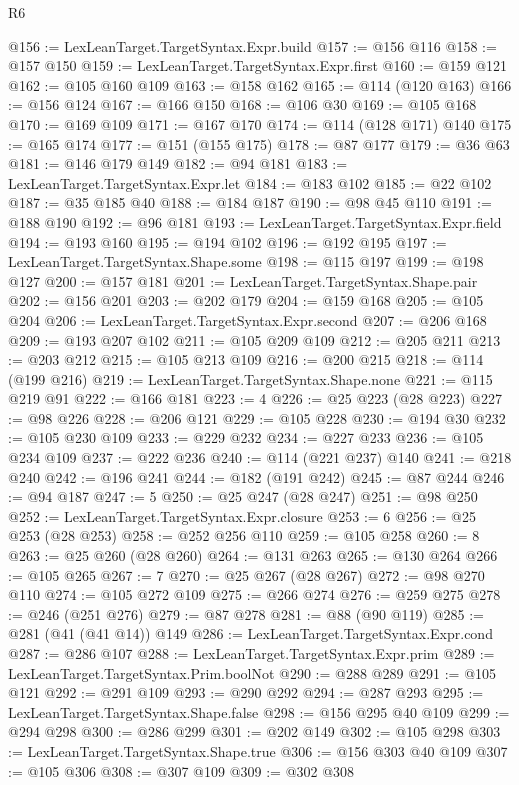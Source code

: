 \begin{lexlean}{R6}
\begin{coremodule}
{{{{{{{{{{{{{{{{{{{{{{{{{{{{{{{{{{{{{{{{{{{{{{{{{{{{{{{{{{{{{@156 := LexLeanTarget.TargetSyntax.Expr.build
@157 := @156 @116
@158 := @157 @150
@159 := LexLeanTarget.TargetSyntax.Expr.first
@160 := @159 @121
@162 := @105 @160 @109
@163 := @158 @162
@165 := @114 (@120 @163)
@166 := @156 @124
@167 := @166 @150
@168 := @106 @30
@169 := @105 @168
@170 := @169 @109
@171 := @167 @170
@174 := @114 (@128 @171) @140
@175 := @165 @174
@177 := @151 (@155 @175)
@178 := @87 @177
@179 := @36 @63
@181 := @146 @179 @149
@182 := @94 @181
@183 := LexLeanTarget.TargetSyntax.Expr.let
@184 := @183 @102
@185 := @22 @102
@187 := @35 @185 @40
@188 := @184 @187
@190 := @98 @45 @110
@191 := @188 @190
@192 := @96 @181
@193 := LexLeanTarget.TargetSyntax.Expr.field
@194 := @193 @160
@195 := @194 @102
@196 := @192 @195
@197 := LexLeanTarget.TargetSyntax.Shape.some
@198 := @115 @197
@199 := @198 @127
@200 := @157 @181
@201 := LexLeanTarget.TargetSyntax.Shape.pair
@202 := @156 @201
@203 := @202 @179
@204 := @159 @168
@205 := @105 @204
@206 := LexLeanTarget.TargetSyntax.Expr.second
@207 := @206 @168
@209 := @193 @207 @102
@211 := @105 @209 @109
@212 := @205 @211
@213 := @203 @212
@215 := @105 @213 @109
@216 := @200 @215
@218 := @114 (@199 @216)
@219 := LexLeanTarget.TargetSyntax.Shape.none
@221 := @115 @219 @91
@222 := @166 @181
@223 := 4
@226 := @25 @223 (@28 @223)
@227 := @98 @226
@228 := @206 @121
@229 := @105 @228
@230 := @194 @30
@232 := @105 @230 @109
@233 := @229 @232
@234 := @227 @233
@236 := @105 @234 @109
@237 := @222 @236
@240 := @114 (@221 @237) @140
@241 := @218 @240
@242 := @196 @241
@244 := @182 (@191 @242)
@245 := @87 @244
@246 := @94 @187
@247 := 5
@250 := @25 @247 (@28 @247)
@251 := @98 @250
@252 := LexLeanTarget.TargetSyntax.Expr.closure
@253 := 6
@256 := @25 @253 (@28 @253)
@258 := @252 @256 @110
@259 := @105 @258
@260 := 8
@263 := @25 @260 (@28 @260)
@264 := @131 @263
@265 := @130 @264
@266 := @105 @265
@267 := 7
@270 := @25 @267 (@28 @267)
@272 := @98 @270 @110
@274 := @105 @272 @109
@275 := @266 @274
@276 := @259 @275
@278 := @246 (@251 @276)
@279 := @87 @278
@281 := @88 (@90 @119)
@285 := @281 (@41 (@41 @14)) @149
@286 := LexLeanTarget.TargetSyntax.Expr.cond
@287 := @286 @107
@288 := LexLeanTarget.TargetSyntax.Expr.prim
@289 := LexLeanTarget.TargetSyntax.Prim.boolNot
@290 := @288 @289
@291 := @105 @121
@292 := @291 @109
@293 := @290 @292
@294 := @287 @293
@295 := LexLeanTarget.TargetSyntax.Shape.false
@298 := @156 @295 @40 @109
@299 := @294 @298
@300 := @286 @299
@301 := @202 @149
@302 := @105 @298
@303 := LexLeanTarget.TargetSyntax.Shape.true
@306 := @156 @303 @40 @109
@307 := @105 @306
@308 := @307 @109
@309 := @302 @308
}}}}}}}}}}}}}}}}}}}}}}}}}}}}}}}}}}}}}}}}}}}}}}}}}}}}}}}}}}}}}
\end{coremodule}
\end{lexlean}
